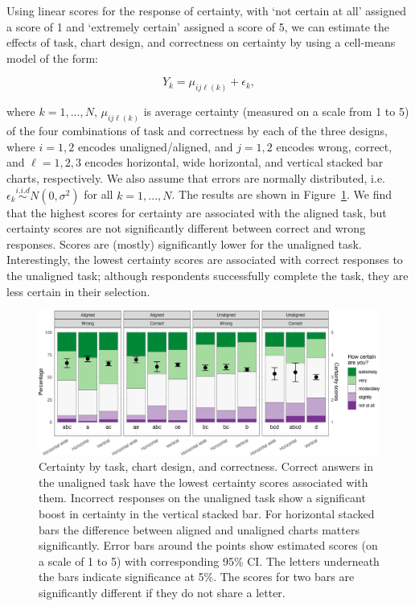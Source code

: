 \documentclass[
]{jds}
\begin{document}
Using linear scores for the response of certainty, with `not certain at
all' assigned a score of 1 and `extremely certain' assigned a score of
5, we can estimate the effects of task, chart design, and correctness on
certainty by using a cell-means model of the form:

\[
Y_{k} = \mu_{ij\ell(k)} + \epsilon_{k},
\]

where \(k = 1, ..., N\), \(\mu_{ij\ell(k)}\) is average certainty
(measured on a scale from 1 to 5) of the four combinations of task and
correctness by each of the three designs, where \(i = 1, 2\) encodes
unaligned/aligned, and \(j=1,2\) encodes wrong, correct, and
\(\ell = 1, 2, 3\) encodes horizontal, wide horizontal, and vertical
stacked bar charts, respectively. We also assume that errors are
normally distributed,
i.e.~\(\epsilon_k \stackrel{i.i.d}{\sim} N(0, \sigma^2)\) for all
\(k = 1, ..., N\). The results are shown in Figure~\ref{fig-certainty}.
We find that the highest scores for certainty are associated with the
aligned task, but certainty scores are not significantly different
between correct and wrong responses. Scores are (mostly) significantly
lower for the unaligned task. Interestingly, the lowest certainty scores
are associated with correct responses to the unaligned task; although
respondents successfully complete the task, they are less certain in
their selection.

\begin{figure}[hbt]

{\centering \includegraphics[width=1\textwidth,height=\textheight]{./figures/fig-certainty-1.png}

}

\caption{\label{fig-certainty}Certainty by task, chart design, and
correctness. Correct answers in the unaligned task have the lowest
certainty scores associated with them. Incorrect responses on the
unaligned task show a significant boost in certainty in the vertical
stacked bar. For horizontal stacked bars the difference between aligned
and unaligned charts matters significantly. Error bars around the points
show estimated scores (on a scale of 1 to 5) with corresponding 95\% CI.
The letters underneath the bars indicate significance at 5\%. The scores
for two bars are significantly different if they do not share a letter.}

\end{figure}
\end{document}

